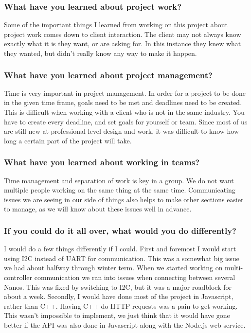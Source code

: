 \documentclass[onecolumn, draftclsnofoot,10pt, compsoc]{IEEEtran}
\begin{document}
			\subsubsection{What have you learned about project work?}
			\noindent Some of the important things I learned from working on this project about project work comes down to
			client interaction. The client may not always know exactly what it is they want, or are asking for. In this
			instance they knew what they wanted, but didn’t really know any way to make it happen.

			\subsubsection{What have you learned about project management?}
			\noindent Time is very important in project management. In order for a project to be done in the given time frame, goals
			 need to be met and deadlines need to be created. This is difficult when working with a client who is not in the same industry.
			 You have to create every deadline, and set goals for yourself or team. Since most of us are still new at professional level
			 design and work, it was difficult to know how long a certain part of the project will take.

			\subsubsection{What have you learned about working in teams?}
			\noindent Time management and separation of work is key in a group. We do not want multiple people working on the same thing at
			the same time. Communicating issues we are seeing in our side of things also helps to make other sections easier to manage, as
			 we will know about these issues well in advance.

			\subsubsection{If you could do it all over, what would you do differently?}
			\noindent I would do a few things differently if I could. First and foremost I would start using I2C instead of UART for communication.
			This was a somewhat big issue we had about halfway through winter term. When we started working on multi-controller communication we ran
			into issues when connecting between several Nanos. This was fixed by switching to I2C, but it was a major roadblock for about a week. Secondly,
			I would have done most of the project in Javascript, rather than C++. Having C++ do HTTP requests was a pain to get working. This wasn’t impossible
			to implement, we just think that it would have gone better if the API was also done in Javascript along with the Node.js web service.
\end{document}
